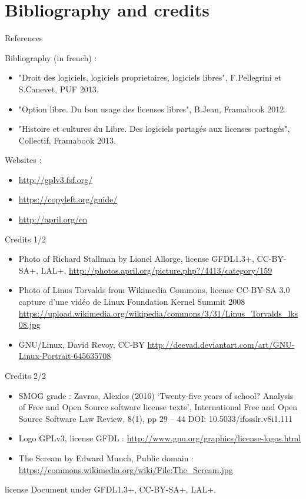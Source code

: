 \documentclass{beamer}
\begin{document}
\section{Bibliography and credits}

\begin{frame}{References}

Bibliography (in french) :

  \begin{itemize}
  \item "Droit des logiciels, logiciels proprietaires, logiciels libres", F.Pellegrini et S.Canevet, PUF 2013.
  \item "Option libre. Du bon usage des licenses libres", B.Jean, Framabook 2012.
  \item "Histoire et cultures du Libre. Des logiciels partagés aux licenses partagés", Collectif, Framabook 2013.
  \end{itemize}

Websites :

\begin{itemize}
\item \url{http://gplv3.fsf.org/}
\item \url{https://copyleft.org/guide/}
\item \url{http://april.org/en}
\end{itemize}
  
\end{frame}

\begin{frame}{Credits 1/2}
  \begin{itemize}
  \item Photo of Richard Stallman by Lionel Allorge, license GFDL1.3+, CC-BY-SA+, LAL+,  \url{http://photos.april.org/picture.php?/4413/category/159}
  \item Photo of Linus Torvalds from Wikimedia Commons, license CC-BY-SA 3.0 capture d'une vidéo de Linux Foundation Kernel Summit 2008 \url{https://upload.wikimedia.org/wikipedia/commons/3/31/Linus_Torvalds_lks08.jpg}
  \item GNU/Linux, David Revoy, CC-BY \url{http://deevad.deviantart.com/art/GNU-Linux-Portrait-645635708}
  
  \end{itemize}
\end{frame}

\begin{frame}{Credits 2/2}
  \begin{itemize}
\item SMOG grade : Zavras, Alexios (2016) ‘Twenty-five years of school? Analysis of Free and Open Source software license texts’, International Free and Open Source Software Law Review, 8(1), pp 29 – 44 DOI: 10.5033/ifosslr.v8i1.111  
\item Logo GPLv3, license GFDL : \url{http://www.gnu.org/graphics/license-logos.html}
\item The Scream by Edward Munch, Public domain : \url{https://commons.wikimedia.org/wiki/File:The_Scream.jpg}

  \end{itemize}
\end{frame}



\begin{frame}{license}
  Document under GFDL1.3+, CC-BY-SA+, LAL+.
\end{frame}
\end{document}
